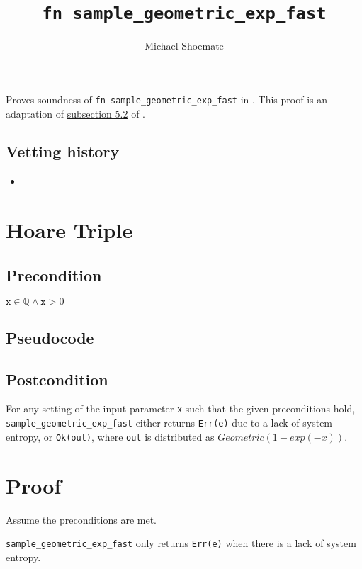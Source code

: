 \documentclass{article}
\title{\texttt{fn sample\_geometric\_exp\_fast}}
\author{Michael Shoemate}
\begin{document}
\maketitle

\contrib
Proves soundness of \texttt{fn sample\_geometric\_exp\_fast} in .
This proof is an adaptation of \href{https://arxiv.org/pdf/2004.00010.pdf#subsection.5.2}{subsection 5.2} of \cite{CKS20}.

\subsection*{Vetting history}
\begin{itemize}
    \item {}
\end{itemize}

\section{Hoare Triple}
\subsection*{Precondition}
$\texttt{x} \in \mathbb{Q} \land \texttt{x} > 0$

\subsection*{Pseudocode}


\subsection*{Postcondition}
\label{postcondition}
For any setting of the input parameter \texttt{x} such that the given preconditions hold, \\
\texttt{sample\_geometric\_exp\_fast} either returns \texttt{Err(e)} due to a lack of system entropy,
or \texttt{Ok(out)}, where \texttt{out} is distributed as $Geometric(1 - exp(-x))$.

\section{Proof}
Assume the preconditions are met.

\begin{lemma}\label{err-e}
    \texttt{sample\_geometric\_exp\_fast} only returns \texttt{Err(e)} when there is a lack of system entropy.
\end{lemma}
\end{document}
